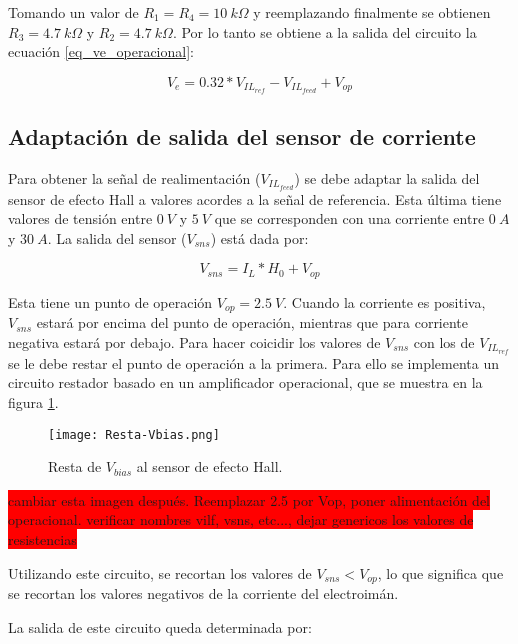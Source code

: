 Tomando un valor de $R_{1} = R_{4} = 10\:k\Omega$ y reemplazando finalmente se obtienen $R_{3}=4.7\:k\Omega$ y $R_{2}=4.7\:k\Omega$. Por lo tanto se obtiene a la salida del circuito la ecuación \ref{eq_ve_operacional}: 

\begin{equation} \label{eq_ve_operacional}
	V_e = 0.32 * V_{IL_{ref}} - V_{IL_{feed}} + V_{op}
\end{equation}


\subsection{Adaptación de salida del sensor de corriente}

Para obtener la señal de realimentación ($V_{IL_{feed}}$) se debe adaptar la salida del sensor de efecto Hall a valores acordes a la señal de referencia. Esta última tiene valores de tensión entre $0\:V$ y $5\:V$ que se corresponden con una corriente entre $0\:A$ y $30\:A$. La salida del sensor ($V_{sns}$) está dada por:

\begin{equation}
	V_{sns}=I_L*H_0+V_{op}
\end{equation}

Esta tiene un punto de operación $V_{op}=2.5\:V$. Cuando la corriente es positiva, $V_{sns}$ estará por encima del punto de operación, mientras que para corriente negativa estará por debajo. Para hacer coicidir los valores de $V_{sns}$ con los de $V_{IL_{ref}}$ se le debe restar el punto de operación a la primera. Para ello se implementa un circuito restador basado en un amplificador operacional, que se muestra en la figura \ref{fig:img_resta-Vbias}.

\begin{figure}[H]
	\centering
	\texttt{[image: Resta-Vbias.png]}
	\caption{Resta de $V_{bias}$ al sensor de efecto Hall.}
	\label{fig:img_resta-Vbias}
\end{figure}

\colorbox{red}{cambiar esta imagen después. Reemplazar 2.5 por Vop, poner alimentación del operacional. verificar nombres vilf, vsns, etc..., dejar genericos los valores de resistencias}

Utilizando este circuito, se recortan los valores de $V_{sns}<V_{op}$, lo que significa que se recortan los valores negativos de la corriente del electroimán.


La salida de este circuito queda determinada por:

